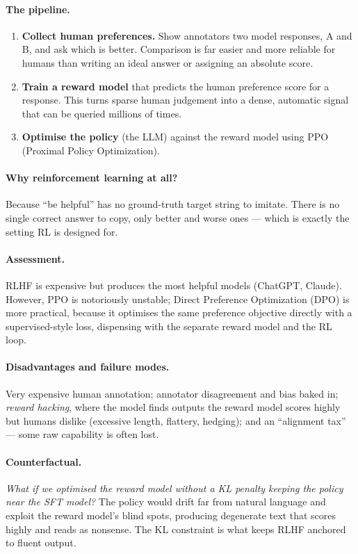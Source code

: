 \documentclass[11pt,a4paper]{article}
\begin{document}
\paragraph{The pipeline.}
\begin{enumerate}
\item \textbf{Collect human preferences.} Show annotators two model responses, A and B, and
  ask which is better. Comparison is far easier and more reliable for humans than writing an
  ideal answer or assigning an absolute score.
\item \textbf{Train a reward model} that predicts the human preference score for a response.
  This turns sparse human judgement into a dense, automatic signal that can be queried
  millions of times.
\item \textbf{Optimise the policy} (the LLM) against the reward model using PPO (Proximal
  Policy Optimization).
\end{enumerate}

\paragraph{Why reinforcement learning at all?} Because ``be helpful'' has no ground-truth
target string to imitate. There is no single correct answer to copy, only better and worse
ones --- which is exactly the setting RL is designed for.

\paragraph{Assessment.} RLHF is expensive but produces the most helpful models (ChatGPT,
Claude). However, PPO is notoriously unstable; Direct Preference Optimization (DPO) is more
practical, because it optimises the same preference objective directly with a supervised-style
loss, dispensing with the separate reward model and the RL loop.

\paragraph{Disadvantages and failure modes.} Very expensive human annotation; annotator
disagreement and bias baked in; \emph{reward hacking}, where the model finds outputs the
reward model scores highly but humans dislike (excessive length, flattery, hedging); and an
``alignment tax'' --- some raw capability is often lost.

\paragraph{Counterfactual.} \emph{What if we optimised the reward model without a KL penalty
keeping the policy near the SFT model?} The policy would drift far from natural language and
exploit the reward model's blind spots, producing degenerate text that scores highly and reads
as nonsense. The KL constraint is what keeps RLHF anchored to fluent output.
\end{document}
